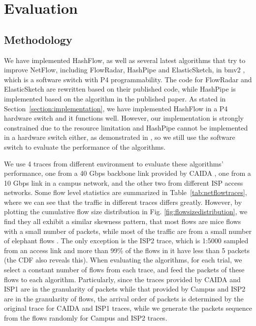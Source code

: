 \section{Evaluation}
\label{section:evaluation}

\subsection{Methodology}\label{methodology}
We have implemented HashFlow, as well as several latest algorithms that try to improve NetFlow, 
including  FlowRadar\cite{li_flowradar:_2016}, HashPipe\cite{sivaraman_heavy-hitter_2017} 
and ElasticSketch\cite{yang_elastic_2018}, in bmv2 \cite{noauthor_bmv2:_2018}, 
which is a software switch with P4 \cite{bosshart_p4:_2014} programmability. 
The code for FlowRadar and ElasticSketch are rewritten based on their published code, 
while HashPipe is implemented based on the algorithm in the published paper. As stated in Section~\ref{section:implementation}, we have implemented HashFlow in a P4 hardware switch\cite{noauthor_edgecore_nodate} and it functions well. However, our implementation is strongly constrained due to the resource limitation and HashPipe cannot be implemented in a hardware switch either, as demonstrated in \cite{ben-basat_efficient_2018}, so we still use the software switch to evaluate the performance of the algorithms.

We use 4 traces from different environment to evaluate these algorithms' performance, 
one from a 40 Gbps backbone link provided by CAIDA \cite{noauthor_caida_nodate},
one from a 10 Gbps link in a campus network, and the other two from different ISP access networks.
Some flow level statistics are summarized in Table~\ref{tab:netflowtraces}, 
where we can see that the traffic in different traces differs greatly.
However, by plotting the cumulative flow size distribution in Fig. \ref{fig:flowsizedistribution}, 
we find they all exhibit a similar skewness pattern, 
that most flows are mice flows with a small number of packets, 
while most of the traffic are from a small number of elephant flows \cite{benson_network_2010}.
The only exception is the ISP2 trace, which is 1:5000 sampled from an access link and 
more than 99\% of the flows in it have less than 5 packets (the CDF also reveals this).
When evaluating the algorithms, for each trial, we select a constant number of flows from each trace, 
and feed the packets of these flows to each algorithm. Particularly, since the traces provided by CAIDA and ISP1 are in the granularity of packets while that provided by Campus and ISP2 are in the granularity of flows, the arrival order of packets is determined by the original trace for CAIDA and ISP1 traces, while we generate the packets sequence from the flows randomly for Campus and ISP2 traces.


